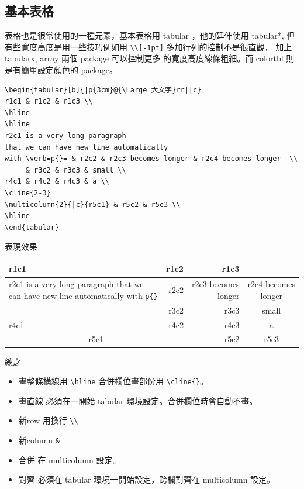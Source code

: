 \subsection{基本表格}
表格也是很常使用的一種元素，基本表格用 tabular ，他的延伸使用
tabular*, 但有些寬度高度是用一些技巧例如用 \verb=\\[-1pt]=
多加行列的控制不是很直觀， 加上tabularx, array 兩個 package 可以控制更多
的寬度高度線條粗細。而 colortbl 則是有簡單設定顏色的 package。
\begin{verbatim}
\begin{tabular}[b]{|p{3cm}@{\Large 大文字}rr||c}
r1c1 & r1c2 & r1c3 \\
\hline
\hline
r2c1 is a very long paragraph 
that we can have new line automatically 
with \verb=p{}= & r2c2 & r2c3 becomes longer & r2c4 becomes longer  \\
     & r3c2 & r3c3 & small \\
r4c1 & r4c2 & r4c3 & a \\
\cline{2-3}
\multicolumn{2}{|c}{r5c1} & r5c2 & r5c3 \\
\hline
\end{tabular}
\end{verbatim}
表現效果
\begin{center}
\begin{tabular}[b]{|p{3cm}@{\Large 大文字}rr||c}
r1c1 & r1c2 & r1c3 \\
\hline
\hline
r2c1 is a very long paragraph 
that we can have new line automatically 
with \verb=p{}= & r2c2 & r2c3 becomes longer & r2c4 becomes longer  \\
     & r3c2 & r3c3 & small \\
r4c1 & r4c2 & r4c3 & a \\
\cline{2-3}
\multicolumn{2}{|c}{r5c1} & r5c2 & r5c3 \\
\hline
\end{tabular}
\end{center}
總之
\begin{itemize}
\item 畫整條橫線用 \verb=\hline= 合併欄位畫部份用 \verb=\cline{}=。
\item 畫直線 必須在一開始 tabular 環境設定。合併欄位時會自動不畫。
\item 新row 用換行 \verb=\\=
\item 新column \verb=&=
\item 合併 在 multicolumn 設定。
\item 對齊 必須在 tabular 環境一開始設定，跨欄對齊在 multicolumn 設定。
\end{itemize}
